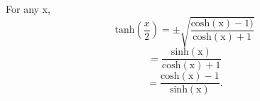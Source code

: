 For any x,
\[ \mathrm{tanh} \left ( \frac{x}{2} \right )
= \pm \sqrt{ \frac{\mathrm{cosh(x)} - 1)}
{  \mathrm{cosh(x)} + 1}} \]
\[ = \frac{\mathrm{sinh(x)}} { \mathrm{cosh(x)} + 1} \]
\[ = \frac{\mathrm{cosh(x)} - 1}  { \mathrm{sinh(x)} } . \]